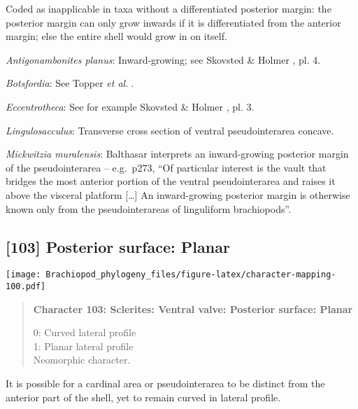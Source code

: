 \documentclass[openany]{book}
\theoremstyle{definition}
\theoremstyle{definition}
\theoremstyle{definition}
\theoremstyle{remark}
\begin{document}
Coded as inapplicable in taxa without a differentiated posterior margin:
the posterior margin can only grow inwards if it is differentiated from
the anterior margin; else the entire shell would grow in on itself.

\hypertarget{Antigonambonites_planus-coding-102}{}
\emph{Antigonambonites planus}: Inward-growing; see Skovsted \& Holmer
\citeyearpar{Skovsted2005EarlyCambrian}, pl. 4.

\hypertarget{Botsfordia-coding-102}{}
\emph{Botsfordia}: See Topper \emph{et al}.
\citeyearpar{Topper2013Reappraisalof}.

\hypertarget{Eccentrotheca-coding-102}{}
\emph{Eccentrotheca}: See for example Skovsted \& Holmer
\citeyearpar{Skovsted2005EarlyCambrian}, pl. 3.

\hypertarget{Lingulosacculus-coding-102}{}
\emph{Lingulosacculus}: Transverse cross section of ventral
pseudointerarea concave.

\hypertarget{Mickwitzia_muralensis-coding-102}{}
\emph{Mickwitzia muralensis}: Balthasar
\citeyearpar{Balthasar2008iMummpikia} interprets an inward-growing
posterior margin of the pseudointerarea -- e.g.~p273, ``Of particular
interest is the vault that bridges the most anterior portion of the
ventral pseudointerarea and raises it above the visceral platform
{[}\ldots{}{]} An inward-growing posterior margin is otherwise known
only from the pseudointerareas of linguliform brachiopods''.

\subsection*{{[}103{]} Posterior surface:
Planar}\label{posterior-surface-planar}

\texttt{[image: Brachiopod\_phylogeny\_files/figure-latex/character-mapping-100.pdf]}

\begin{quote}
\textbf{Character 103: Sclerites: Ventral valve: Posterior surface:
Planar}

0: Curved lateral profile\\
1: Planar lateral profile\\
Neomorphic character.
\end{quote}

It is possible for a cardinal area or pseudointerarea to be distinct
from the anterior part of the shell, yet to remain curved in lateral
profile.
\end{document}
